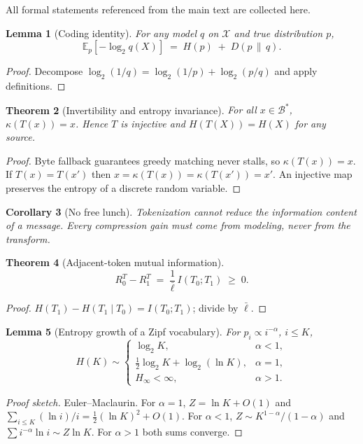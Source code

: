 \documentclass[10pt,twocolumn]{article}
\theoremstyle{plain}
\newtheorem{theorem}{Theorem}[section]
\newtheorem{lemma}[theorem]{Lemma}
\newtheorem{corollary}[theorem]{Corollary}
\theoremstyle{definition}
\newcommand{\B}{\mathcal{B}}
\newcommand{\KL}[2]{D\!\left(#1 \,\|\, #2\right)}
\begin{document}
All formal statements referenced from the main text are collected here.

\begin{lemma}[Coding identity]\label{lem:coding}
For any model $q$ on $\mathcal{X}$ and true distribution $p$,
\[
\mathbb{E}_p\!\left[-\log_2 q(X)\right] \;=\; H(p) \;+\; \KL{p}{q}.
\]
\end{lemma}
\begin{proof}
Decompose $\log_2(1/q) = \log_2(1/p) + \log_2(p/q)$ and apply definitions.
\end{proof}

\begin{theorem}[Invertibility and entropy invariance]\label{thm:invert}
For all $x \in \B^*$, $\kappa(T(x)) = x$. Hence $T$ is injective and
$H(T(X)) = H(X)$ for any source.
\end{theorem}
\begin{proof}
Byte fallback guarantees greedy matching never stalls, so $\kappa(T(x)) = x$. If
$T(x) = T(x')$ then $x = \kappa(T(x)) = \kappa(T(x')) = x'$. An injective map
preserves the entropy of a discrete random variable.
\end{proof}

\begin{corollary}[No free lunch]\label{cor:nofreelunch}
Tokenization cannot reduce the information content of a message. Every compression
gain must come from \emph{modeling}, never from the transform.
\end{corollary}

\begin{theorem}[Adjacent-token mutual information]\label{thm:mi}
\[
R_0^T - R_1^T \;=\; \frac{1}{\bar\ell}\, I(T_0;T_1) \;\ge\; 0 .
\]
\end{theorem}
\begin{proof}
$H(T_1) - H(T_1 \mid T_0) = I(T_0;T_1)$; divide by $\bar\ell$.
\end{proof}

\begin{lemma}[Entropy growth of a Zipf vocabulary]\label{lem:zipf}
For $p_i \propto i^{-\alpha}$, $i \le K$,
\[
H(K) \sim
\begin{cases}
\log_2 K, & \alpha < 1,\\[2pt]
\tfrac12\log_2 K + \log_2(\ln K), & \alpha = 1,\\[2pt]
H_\infty < \infty, & \alpha > 1 .
\end{cases}
\]
\end{lemma}
\begin{proof}[Proof sketch]
Euler--Maclaurin. For $\alpha = 1$, $Z = \ln K + O(1)$ and
$\sum_{i \le K}(\ln i)/i = \tfrac12(\ln K)^2 + O(1)$. For $\alpha < 1$,
$Z \sim K^{1-\alpha}/(1-\alpha)$ and $\sum i^{-\alpha}\ln i \sim Z \ln K$. For
$\alpha > 1$ both sums converge.
\end{proof}
\end{document}
